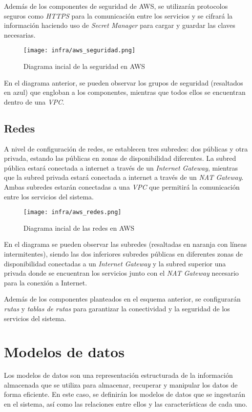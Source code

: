 Además de los componentes de seguridad de AWS, se utilizarán protocolos seguros
como \textit{HTTPS} para la comunicación entre los servicios y se cifrará la
información haciendo uso de \textit{Secret Manager} para cargar y guardar las
claves necesarias.


\begin{figure}[H]
	\centerline{\texttt{[image: infra/aws\_seguridad.png]}}
	\caption{Diagrama incial de la seguridad en AWS}
	\label{fig:aws_seguridad}
\end{figure}

En el diagrama anterior, se pueden observar los grupos de seguridad (resaltados
en azul) que engloban a los componentes, mientras que todos ellos se encuentran
dentro de una \textit{VPC}.

\subsection{Redes}\label{subsec:redes}
A nivel de configuración de redes, se establecen tres subredes: dos públicas y
otra privada, estando las públicas en zonas de disponibilidad diferentes. La
subred pública estará conectada a internet a través de un
\textit{Internet Gateway}, mientras que la subred privada estará conectada a
internet a través de un \textit{NAT Gateway}. Ambas subredes estarán conectadas
a una \textit{VPC} que permitirá la comunicación entre los servicios del
sistema.

\begin{figure}[H]
	\centerline{\texttt{[image: infra/aws\_redes.png]}}
	\caption{Diagrama incial de las redes en AWS}
	\label{fig:aws_redes}
\end{figure}

En el diagrama se pueden observar las subredes (resaltadas en naranja con líneas
intermitentes), siendo las dos inferiores subredes públicas en diferentes zonas
de disponibilidad conectadas a un \textit{Internet Gateway} y la subred superior
una privada donde se encuentran los servicios junto con el \textit{NAT Gateway}
necesario para la conexión a Internet.

Además de los componentes planteados en el esquema anterior, se configurarán
\textit{rutas} y \textit{tablas de rutas} para garantizar la conectividad y la
seguridad de los servicios del sistema.


\newpage{}
\section{Modelos de datos}\label{sec:modelo}
Los modelos de datos son una representación estructurada de la información
almacenada que se utiliza para almacenar, recuperar y manipular los datos de
forma eficiente. En este caso, se definirán los modelos de datos que se
ingestarán en el sistema, así como las relaciones entre ellos y las
características de cada uno.

